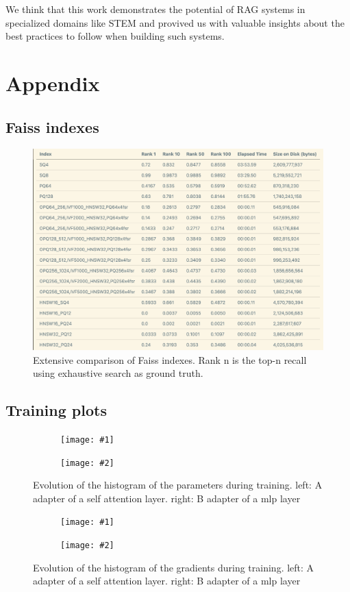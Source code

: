 \documentclass[11pt]{article}
\newcommand{\sideBySideImages}[5]{%
    \begin{figure}[ht]
        \centering
        \begin{subfigure}{#3\linewidth}
            \centering
            \texttt{[image: \#1]}
        \end{subfigure}%
        \hfill%
        \begin{subfigure}{#3\linewidth}
            \centering
            \texttt{[image: \#2]}
        \end{subfigure}
        \caption{#5}
        \label{#4}
    \end{figure}
}
\begin{document}
We think that this work demonstrates the potential of RAG systems in specialized 
domains like STEM and provived us with valuable insights about the best practices 
to follow when building such systems.

\newpage



\nocite{*}

\appendix

\section{Appendix}
\label{sec:appendix}

\subsection{Faiss indexes}

\begin{figure}[h]
    \centering
    \includegraphics[width=0.8\linewidth]{figures/faiss-indexes-extensive.png}
    \caption{Extensive comparison of Faiss indexes. Rank n is the top-n recall using exhaustive search as ground truth.}
    \label{fig:faiss-indexes-extensive}
\end{figure}

\subsection{Training plots}

\sideBySideImages{figures/paramsA.png}{figures/paramsB.png}{0.48}{fig:params}{Evolution of the histogram of the parameters during training. left: A adapter of a self attention layer. right: B adapter of a mlp layer}

\sideBySideImages{figures/gradientsA.png}{figures/gradientsB.png}{0.48}{fig:gradients}{Evolution of the histogram of the gradients during training. left: A adapter of a self attention layer. right: B adapter of a mlp layer}
\end{document}
